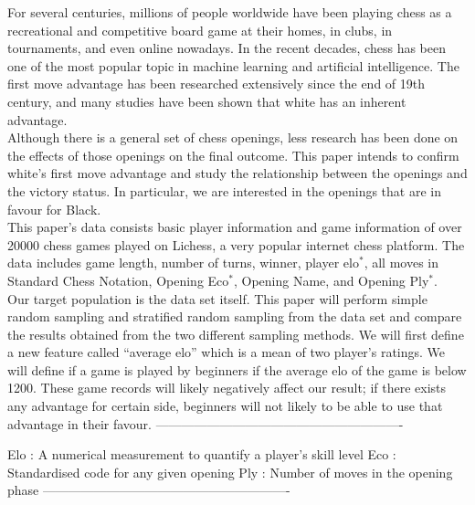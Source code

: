 \documentclass[11pt,]{article}
\begin{document}
For several centuries, millions of people worldwide have been playing
chess as a recreational and competitive board game at their homes, in
clubs, in tournaments, and even online nowadays. In the recent decades,
chess has been one of the most popular topic in machine learning and
artificial intelligence. The first move advantage has been researched
extensively since the end of 19th century, and many studies have been
shown that white has an inherent advantage.\\
\newline Although there is a general set of chess openings, less
research has been done on the effects of those openings on the final
outcome. This paper intends to confirm white's first move advantage and
study the relationship between the openings and the victory status. In
particular, we are interested in the openings that are in favour for
Black.\\
\newline This paper's data consists basic player information and game
information of over 20000 chess games played on Lichess, a very popular
internet chess platform. The data includes game length, number of turns,
winner, player elo\(^*\), all moves in Standard Chess Notation, Opening
Eco\(^*\), Opening Name, and Opening Ply\(^*\).\\
\newline Our target population is the data set itself. This paper will
perform simple random sampling and stratified random sampling from the
data set and compare the results obtained from the two different
sampling methods. We will first define a new feature called ``average
elo'' which is a mean of two player's ratings. We will define if a game
is played by beginners if the average elo of the game is below 1200.
These game records will likely negatively affect our result; if there
exists any advantage for certain side, beginners will not likely to be
able to use that advantage in their favour. \newline
----------------------------------------------------------

\begin{flushleft}
Elo : A numerical measurement to quantify a player's skill level\newline
Eco : Standardised code for any given opening\newline
Ply : Number of moves in the opening phase\newline
----------------------------------------------------------
\end{flushleft}
\end{document}
